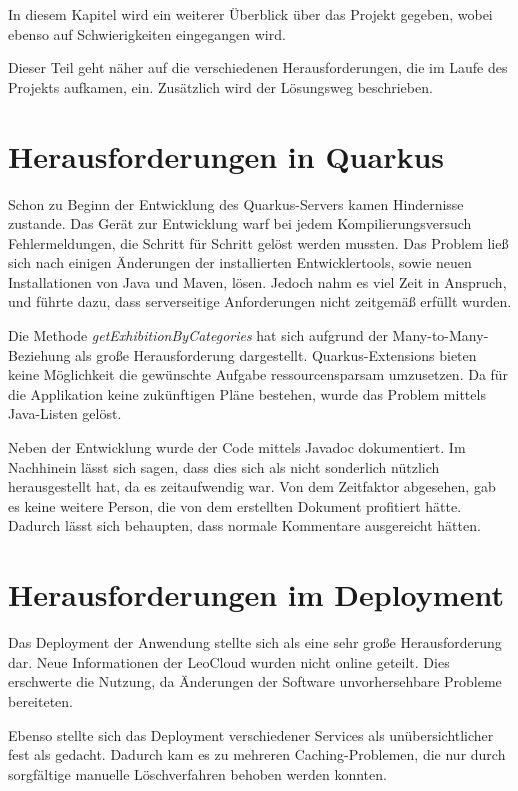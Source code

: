 In diesem Kapitel wird ein weiterer Überblick über das Projekt gegeben, wobei ebenso auf Schwierigkeiten eingegangen wird.

Dieser Teil geht näher auf die verschiedenen Herausforderungen, die im Laufe des Projekts aufkamen, ein. 
Zusätzlich wird der Lösungsweg beschrieben. 

\section{Herausforderungen in Quarkus}

Schon zu Beginn der Entwicklung des Quarkus-Servers kamen Hindernisse zustande. 
Das Gerät zur Entwicklung warf bei jedem Kompilierungsversuch Fehlermeldungen, die Schritt für Schritt gelöst werden mussten. 
Das Problem ließ sich nach einigen Änderungen der installierten Entwicklertools, sowie neuen Installationen von Java und Maven, lösen. 
Jedoch nahm es viel Zeit in Anspruch, und führte dazu, dass serverseitige Anforderungen nicht zeitgemäß erfüllt wurden. 

Die Methode \emph{getExhibitionByCategories} hat sich aufgrund der Many-to-Many-Beziehung als große Herausforderung dargestellt. 
Quarkus-Extensions bieten keine Möglichkeit die gewünschte Aufgabe ressourcensparsam umzusetzen. 
Da für die Applikation keine zukünftigen Pläne bestehen, wurde das Problem mittels Java-Listen gelöst. 

Neben der Entwicklung wurde der Code mittels Javadoc dokumentiert. 
Im Nachhinein lässt sich sagen, dass dies sich als nicht sonderlich nützlich herausgestellt hat, da es zeitaufwendig war.
Von dem Zeitfaktor abgesehen, gab es keine weitere Person, die von dem erstellten Dokument profitiert hätte. 
Dadurch lässt sich behaupten, dass normale Kommentare ausgereicht hätten. 

\section{Herausforderungen im Deployment}

Das Deployment der Anwendung stellte sich als eine sehr große Herausforderung dar. 
Neue Informationen der LeoCloud wurden nicht online geteilt. 
Dies erschwerte die Nutzung, da Änderungen der Software unvorhersehbare Probleme bereiteten.

Ebenso stellte sich das Deployment verschiedener Services als unübersichtlicher fest als gedacht. 
Dadurch kam es zu mehreren Caching-Problemen, die nur durch sorgfältige manuelle Löschverfahren behoben werden konnten. 


